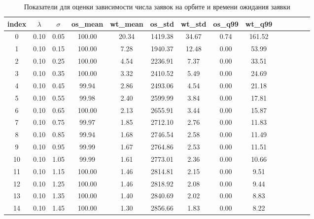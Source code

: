 \begin{table}[H] 
	\centering
	\caption{Показатели для оценки зависимости числа заявок на орбите и времени ожидания заявки}
	\label{sim_result_1}
\begin{tabular}{|c|c|c|c|c|c|c|c|c|c|c|c|c|c|} 
\hline
index & $\lambda$ &  $\sigma$ &  os\_mean &   wt\_mean &      os\_std &     wt\_std &       os\_q99 &     wt\_q99 \\
\hline
	0  &             0.10 &             0.05 &   100.00 &    20.34 & 1419.38 &   34.67 &    0.74 &  161.52 \\
\hline
	1  &             0.10 &             0.15 &   100.00 &     7.28 & 1940.37 &   12.48 &    0.00 &   53.99 \\
\hline
	2  &             0.10 &             0.25 &   100.00 &     4.54 & 2236.91 &    7.37 &    0.00 &   33.51 \\
\hline
	3  &             0.10 &             0.35 &   100.00 &     3.32 & 2410.52 &    5.49 &    0.00 &   24.69 \\
\hline
	4  &             0.10 &             0.45 &    99.94 &     2.86 & 2493.06 &    4.54 &    0.00 &   21.18 \\
\hline
	5  &             0.10 &             0.55 &    99.98 &     2.40 & 2599.99 &    3.84 &    0.00 &   17.81 \\
\hline
	6  &             0.10 &             0.65 &   100.00 &     2.13 & 2655.91 &    3.44 &    0.00 &   15.87 \\
\hline
	7  &             0.10 &             0.75 &    99.97 &     1.85 & 2712.10 &    2.76 &    0.00 &   11.83 \\
\hline
	8  &             0.10 &             0.85 &    99.94 &     1.68 & 2746.54 &    2.58 &    0.00 &   11.49 \\
\hline
	9  &             0.10 &             0.95 &    99.99 &     1.67 & 2764.86 &    2.53 &    0.00 &   11.51 \\
\hline
	10 &             0.10 &             1.05 &    99.99 &     1.61 & 2773.01 &    2.36 &    0.00 &   10.66 \\
\hline
	11 &             0.10 &             1.15 &   100.00 &     1.46 & 2814.81 &    2.15 &    0.00 &    9.51 \\
\hline
	12 &             0.10 &             1.25 &   100.00 &     1.46 & 2818.92 &    2.08 &    0.00 &    9.44 \\
\hline
	13 &             0.10 &             1.35 &   100.00 &     1.40 & 2840.69 &    2.02 &    0.00 &    8.83 \\
\hline
	14 &             0.10 &             1.45 &   100.00 &     1.30 & 2856.66 &    1.83 &    0.00 &    8.22 \\
\hline
\end{tabular}
\end{table}

